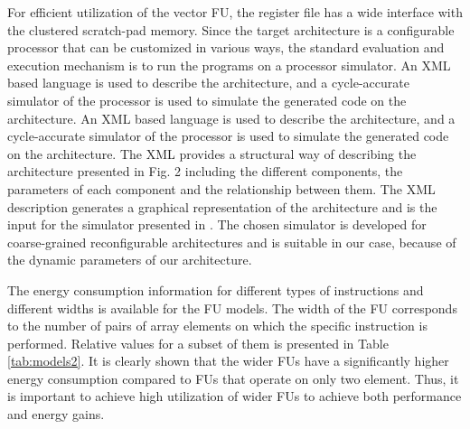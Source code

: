 \documentclass[prodmode,acmtecs]{acmsmall}
\begin{document}
For efficient utilization of the vector FU, the register file has a wide interface with the clustered scratch-pad memory. 
Since the target architecture is a configurable processor that can be customized in various ways, the standard evaluation and execution mechanism is to run the programs on a processor simulator. 
An XML based language is used to describe the architecture, and a cycle-accurate simulator of the processor is used to simulate the generated code on the architecture.
An XML based language is used to describe the architecture, and a cycle-accurate simulator of the processor is used to simulate the generated code on the architecture. The XML provides a structural way of describing the architecture presented in Fig. 2 including the different components, the parameters of each component and the relationship between them. The XML description generates a graphical representation of the architecture and is the input for the simulator presented in \cite{xml}. The chosen simulator is developed for coarse-grained reconfigurable architectures and is suitable in our case, because of the dynamic parameters of our architecture.
 
The energy consumption information for different types of instructions and different widths is available for the FU models.
The width of the FU corresponds to the number of pairs of array elements on which the specific instruction is performed.
Relative values for a subset of them is presented in Table \ref{tab:models2}. 
It is clearly shown that the wider FUs have a significantly higher energy consumption compared to FUs that operate on only two element.
Thus, it is important to achieve high utilization of wider FUs to achieve both performance and energy gains.

\begin{table}
\begin{tabnote}%
\end{tabnote}%
\end{table}
\end{document}
